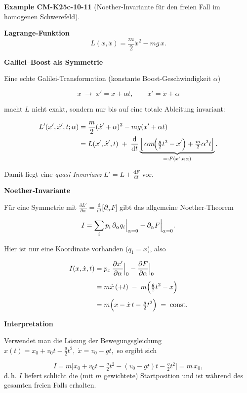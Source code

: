 \documentclass[10pt, letterpaper]{article}
\newcommand{\CustomHeading}[3]{%
  \par\medskip\noindent%
  \textbf{#1 #2} \textnormal{(#3)}.\enskip%
}
\newenvironment{EXA}[2]{\CustomHeading{Example}{#1}{#2}}{}
\begin{document}
\begin{EXA}{CM-K25c-10-11}{Noether‐Invariante für den freien Fall im homogenen Schwerefeld}
\textbf{Lagrange‐Funktion}
\[
  L(x,\dot x)=\frac{m}{2}\dot x^{2}-mg\,x .
\]

\textbf{Galilei–Boost als Symmetrie}

Eine echte Galilei‐Transformation (konstante Boost‐Geschwindigkeit
$\alpha$)

\[
  x\;\longrightarrow\;x' = x + \alpha t,
  \qquad
  \dot x' = \dot x + \alpha
\]

macht $L$ nicht exakt, sondern nur bis auf eine totale Ableitung
invariant:

\[
\begin{aligned}
  L'(x',\dot x',t;\alpha)
  &=\frac{m}{2}(\dot x'+\alpha)^{2}-mg(x'+\alpha t)\\
  &=L(x',\dot x',t)\;+\;
    \frac{\mathrm d}{\mathrm dt}
    \underbrace{%
      \Bigl[\,
        \alpha m\!\Bigl(\tfrac{g}{2}t^{2}-x'\Bigr)
       +\tfrac{m}{2}\alpha^{2}t
      \Bigr]}_{=:F(x',t;\alpha)} .
\end{aligned}
\]

Damit liegt eine \emph{quasi‐Invarianz}
$L'\!=\!L+\frac{\mathrm dF}{\mathrm dt}$ vor.

\textbf{Noether‐Invariante}

Für eine Symmetrie mit $\frac{\partial L'}{\partial\alpha}
      =\frac{\mathrm d}{\mathrm dt}\bigl[\partial_\alpha F\bigr]$
gibt das allgemeine Noether‐Theorem

\[
  I=\sum_{i}p_i\,\Bigl.\partial_\alpha q_i\Bigr|_{\alpha=0}
     -\Bigl.\partial_\alpha F\Bigr|_{\alpha=0}.
\]

Hier ist nur eine Koordinate vorhanden ($q_1=x$), also

\[
\begin{aligned}
  I(x,\dot x,t)
  &=
    p_x\,
    \Bigl.\frac{\partial x'}{\partial\alpha}\Bigr|_{0}
    -\Bigl.\frac{\partial F}{\partial\alpha}\Bigr|_{0} \\[4pt]
  &=
    m\dot x\,(+t)\;-\;
    m\Bigl(\tfrac{g}{2}t^{2}-x\Bigr) \\[4pt]
  &=
    m\Bigl(x-\dot x\,t-\tfrac{g}{2}t^{2}\Bigr)
    \;=\;\text{const.}
\end{aligned}
\]

\textbf{Interpretation}

Verwendet man die Lösung der Bewegungsgleichung
\(
  x(t)=x_{0}+v_{0}t-\tfrac{g}{2}t^{2},
  \;
  \dot x=v_{0}-gt,
\)
so ergibt sich

\[
  I = m\bigl[x_{0}+v_{0}t-\tfrac{g}{2}t^{2}
            -(v_{0}-gt)t-\tfrac{g}{2}t^{2}\bigr]
    = m\,x_{0},
\]
d.\,h. $I$ liefert schlicht die (mit $m$ gewichtete) Startposition
und ist während des gesamten freien Falls erhalten.
\end{EXA}
\end{document}
